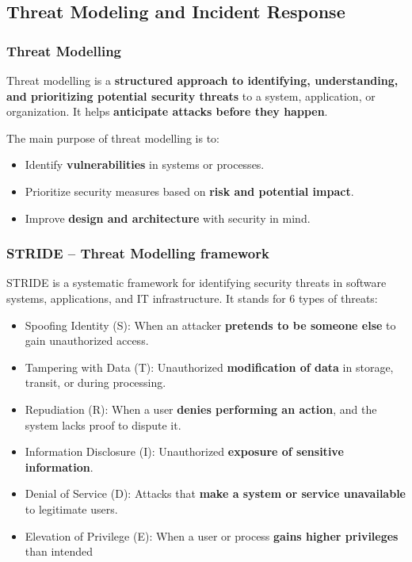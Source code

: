 \subsection{Threat Modeling and Incident Response}

\subsubsection{Threat Modelling}

\indent 

Threat modelling is a \textbf{structured approach to identifying, understanding, and prioritizing potential security threats} to a system, application, or organization. It helps \textbf{anticipate attacks before they happen}.

The main purpose of threat modelling is to:

\begin{itemize}
    \item Identify \textbf{vulnerabilities} in systems or processes.
    \item Prioritize security measures based on \textbf{risk and potential impact}.
    \item Improve \textbf{design and architecture} with security in mind.
\end{itemize}

\subsubsection{STRIDE – Threat Modelling framework}

\indent 

STRIDE is a systematic framework for identifying security threats in software systems, applications, and IT infrastructure. It stands for 6 types of threats:

\begin{itemize}
    \item Spoofing Identity (S): When an attacker \textbf{pretends to be someone else} to gain unauthorized access.
    \item Tampering with Data (T): Unauthorized \textbf{modification of data} in storage, transit, or during processing.
    \item Repudiation (R): When a user \textbf{denies performing an action}, and the system lacks proof to dispute it.
    \item Information Disclosure (I): Unauthorized \textbf{exposure of sensitive information}.
    \item Denial of Service (D): Attacks that \textbf{make a system or service unavailable} to legitimate users.
    \item Elevation of Privilege (E): When a user or process \textbf{gains higher privileges} than intended
\end{itemize}

